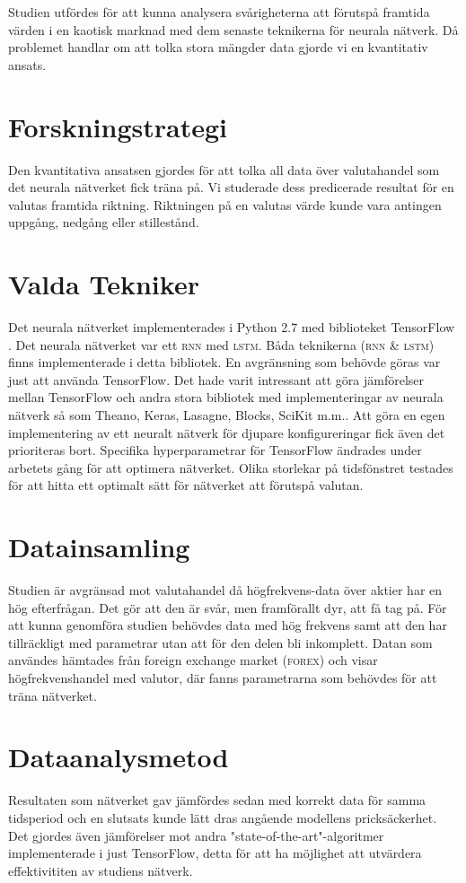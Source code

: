 Studien utfördes för att kunna analysera svårigheterna att förutspå framtida
värden i en kaotisk marknad med dem senaste teknikerna för neurala nätverk. Då
problemet handlar om att tolka stora mängder data gjorde vi en kvantitativ
ansats.

\section{Forskningstrategi}
Den kvantitativa ansatsen gjordes för att tolka all data över valutahandel som
det neurala nätverket fick träna på. Vi studerade dess predicerade resultat för
en valutas framtida riktning. Riktningen på en valutas värde kunde vara antingen
uppgång, nedgång eller stillestånd.

\section{Valda Tekniker}
Det neurala nätverket implementerades i Python 2.7 med biblioteket TensorFlow
\citep{tensorflow2015-whitepaper}. Det neurala nätverket var ett \textsc{rnn}
med \textsc{lstm}. Båda teknikerna \textsc{(rnn \& lstm)} finns implementerade i
detta bibliotek. En avgränsning som behövde göras var just att använda TensorFlow.
Det hade varit intressant att
göra jämförelser mellan TensorFlow och andra stora bibliotek med
implementeringar av neurala nätverk så som Theano, Keras, Lasagne, Blocks,
SciKit m.m.. Att göra en egen implementering av ett neuralt nätverk för djupare
konfigureringar fick även det prioriteras bort. Specifika hyperparametrar för
TensorFlow ändrades under arbetets gång för att optimera nätverket. Olika
storlekar på tidsfönstret testades för att hitta ett optimalt sätt för nätverket
att förutspå valutan.

\section{Datainsamling}
Studien är avgränsad mot valutahandel då högfrekvens-data över aktier har en hög
efterfrågan. Det gör att den är svår, men framförallt dyr, att få tag på. För
att kunna genomföra studien behövdes data med hög frekvens samt att den har
tillräckligt med parametrar utan att för den delen bli inkomplett. Datan som
användes hämtades från foreign exchange market \textsc{(forex)} och visar
högfrekvenshandel med valutor, där fanns parametrarna som behövdes för att träna
nätverket.

\section{Dataanalysmetod}
Resultaten som nätverket gav jämfördes sedan med korrekt data för samma
tidsperiod och en slutsats kunde lätt dras angående modellens
pricksäckerhet. Det gjordes även jämförelser mot andra
"state-of-the-art"-algoritmer implementerade i just TensorFlow, detta för att ha
möjlighet att utvärdera effektivititen av studiens nätverk.
